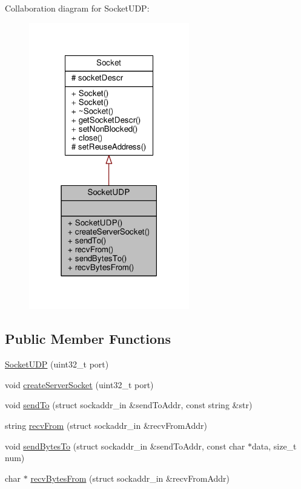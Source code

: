 Collaboration diagram for Socket\-U\-D\-P\-:
\nopagebreak
\begin{figure}[H]
\begin{center}
\leavevmode
\includegraphics[width=198pt]{class_socket_u_d_p__coll__graph}
\end{center}
\end{figure}
\subsection*{Public Member Functions}
\begin{DoxyCompactItemize}
\item 
\hyperlink{class_socket_u_d_p_aa41096c8eecdf55a7557549e8f6a5d4a}{Socket\-U\-D\-P} (uint32\-\_\-t port)
\item 
void \hyperlink{class_socket_u_d_p_a48b2c650565eba38d9654ac16d21c60c}{create\-Server\-Socket} (uint32\-\_\-t port)
\item 
void \hyperlink{class_socket_u_d_p_a207c3d7c2b854b140dcb4ca9a9c81292}{send\-To} (struct sockaddr\-\_\-in \&send\-To\-Addr, const string \&str)
\item 
string \hyperlink{class_socket_u_d_p_ad5a3b81f16a9db0db80a92f69c811fe1}{recv\-From} (struct sockaddr\-\_\-in \&recv\-From\-Addr)
\item 
void \hyperlink{class_socket_u_d_p_a69cce05867435fb471a50319855e34fc}{send\-Bytes\-To} (struct sockaddr\-\_\-in \&send\-To\-Addr, const char $\ast$data, size\-\_\-t num)
\item 
char $\ast$ \hyperlink{class_socket_u_d_p_a4c3ff487d034850ad2096339cfa06707}{recv\-Bytes\-From} (struct sockaddr\-\_\-in \&recv\-From\-Addr)
\end{DoxyCompactItemize}


